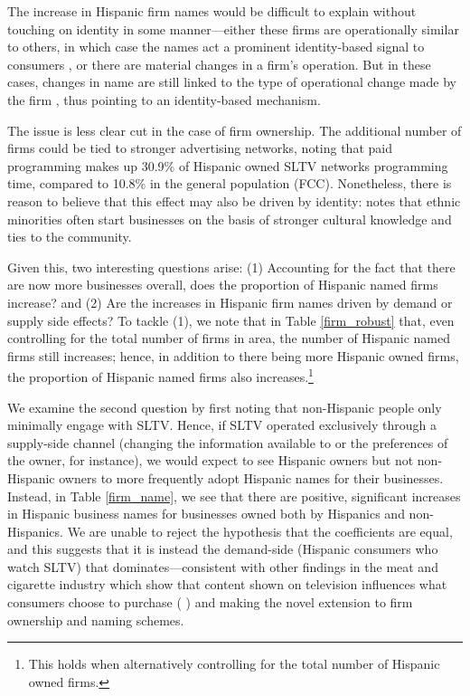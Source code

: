 \documentclass[11pt]{article}
\begin{document}

The increase in Hispanic firm names would be difficult to explain without touching on identity in some manner---either these firms are operationally similar to others, in which case the names act a prominent identity-based signal to consumers \citep{mcdevitt__2014}, or there are material changes in a firm's operation. But in these cases, changes in name are still linked to the type of operational change made by the firm \citep{horsky_does_1987}, thus pointing to an identity-based mechanism. 

The issue is less clear cut in the case of firm ownership. The additional number of firms could be tied to stronger advertising networks, noting that paid programming makes up 30.9\% of Hispanic owned SLTV networks programming time, compared to 10.8\% in the general population (FCC\cite{noauthor_hispanic_2016}). Nonetheless, there is reason to believe that this effect may also be driven by identity: \cite{piperopoulos_ethnic_2012} notes that ethnic minorities often start businesses on the basis of stronger cultural knowledge and ties to the community. 

Given this, two interesting questions arise: (1) Accounting for the fact that there are now more businesses overall, does the proportion of Hispanic named firms increase? and (2) Are the increases in Hispanic firm names driven by demand or supply side effects? To tackle (1), we note that in Table \ref{firm_robust} that, even controlling for the total number of firms in area, the number of Hispanic named firms still increases; hence, in addition to there being more Hispanic owned firms, the proportion of Hispanic named firms also increases.\footnote{ This holds when alternatively controlling for the total number of Hispanic owned firms.} 

We examine the second question by first noting that non-Hispanic people only minimally engage with SLTV. Hence, if SLTV operated exclusively through a supply-side channel (changing the information available to or the preferences of the owner, for instance), we would expect to see Hispanic owners but not non-Hispanic owners to more frequently adopt Hispanic names for their businesses. Instead, in Table \ref{firm_name}, we see that there are positive, significant increases in Hispanic business names for businesses owned both by Hispanics and non-Hispanics. We are unable to reject the hypothesis that the coefficients are equal, and this suggests that it is instead the demand-side (Hispanic consumers who watch SLTV) that dominates---consistent with other findings in the meat and cigarette industry which show that content shown on television influences what consumers choose to purchase (\cite{baltagi_estimating_1986} \cite{verbeke_probit_2000}) and making the novel extension to firm ownership and naming schemes. 
\end{document}
